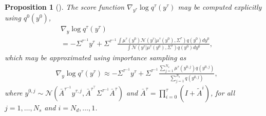 \documentclass[letterpaper, 10 pt, conference]{IEEEconf}
\newtheorem{proposition}{Proposition}
\begin{document}
\begin{proposition}[\cite{pan2024model}] \label{prop:score_function}
    The score function $\nabla_{y^{\tau}} \log{q^{\tau}(y^{\tau})}$ may be computed explicitly using $q^{0}(y^{0})$,
    \begin{align} \label{eq:score_function}
        &\nabla_{y} \log{q^{\tau}(y^{\tau})} \\
        & = - \Sigma^{\tau^{-1}} y^{\tau} + \Sigma^{\tau^{-1}} \frac{\int \mu^{\tau}(y^0) \mathcal{N}(y^{\tau} | \mu^{\tau}(y^0), \Sigma^{\tau}) q(y^{0}) dy^{0}} {\int \mathcal{N}(y^{\tau} | \mu^{\tau}(y^0), \Sigma^{\tau}) q(y^{0}) dy^{0}}, \nonumber
    \end{align}
    which may be approximated using importance sampling as
    \begin{align}\label{eq:is_score_function}
        &\nabla_{y} \log{q^{\tau}(y^{\tau})}
        \approx - \Sigma^{\tau^{-1}} y^{\tau} + \Sigma^{\tau^{-1}} \frac{\sum_{j=1}^{N_s} \mu^{\tau}(y^{0, j}) q(y^{0, j})} {\sum_{j=1}^{N_s} q(y^{0, j})},
    \end{align}
    where $y^{0, j} \sim \mathcal{N}(\bar{A}^{\tau^{-1}} y^{\tau, j}, \bar{A}^{\tau^\top} \Sigma^{\tau^{-1}} \bar{A}^{\tau})$ and $\bar{A}^{\tau} = \prod_{i=0}^{\tau} (I + \tilde{A}^{i})$, for all $j = 1, \dots, N_s$ and $i = N_d, \dots, 1$.
\end{proposition}
\end{document}
